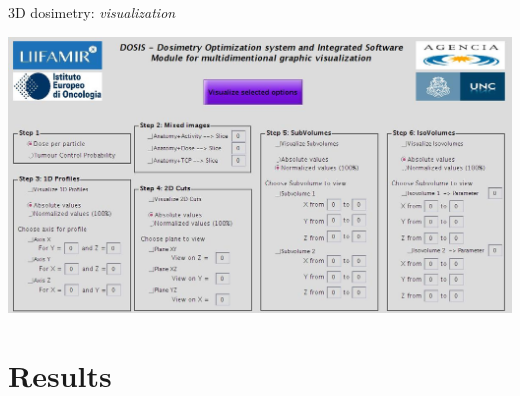 \documentclass[ignorenonframetext,]{beamer}
\begin{document}
\begin{frame}{3D dosimetry: \emph{visualization}}
\protect\hypertarget{d-dosimetry-visualization}{}

\includegraphics{imgs/3d-viz.jpg}

\end{frame}

\hypertarget{results}{%
\section{Results}\label{results}}
\end{document}
